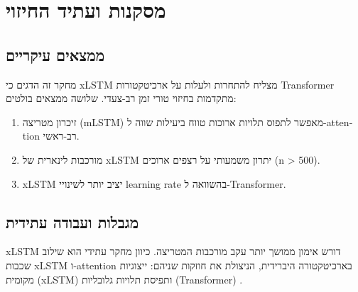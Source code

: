 
\clearpage
\chapter{מסקנות ועתיד החיזוי}

\section{ממצאים עיקריים}

מחקר זה הדגים כי \textenglish{xLSTM} \cite{beck2024xlstm} מצליח להתחרות ולעלות על ארכיטקטורות \textenglish{Transformer} מתקדמות בחיזוי טורי זמן רב-צעדי. שלושה ממצאים בולטים:

\begin{enumerate}
\item זיכרון מטריצה (\textenglish{mLSTM}) מאפשר לתפוס תלויות ארוכות טווח ביעילות שווה ל-\textenglish{attention} רב-ראשי.
\item מורכבות לינארית של \textenglish{xLSTM} יתרון משמעותי על רצפים ארוכים (\textenglish{n > 500}).
\item \textenglish{xLSTM} יציב יותר לשינויי \textenglish{learning rate} בהשוואה ל-\textenglish{Transformer}.
\end{enumerate}

\section{מגבלות ועבודה עתידית}

\textenglish{xLSTM} דורש אימון ממושך יותר עקב מורכבות המטריצה. כיוון מחקר עתידי הוא שילוב שכבות \textenglish{xLSTM} ו-\textenglish{attention} בארכיטקטורה היברידית, הניצולת את חוזקות שניהם: ייצוגיות מקומית (\textenglish{xLSTM}) ותפיסת תלויות גלובליות (\textenglish{Transformer}) \cite{nie2022patchtst}.
